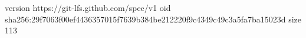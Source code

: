 version https://git-lfs.github.com/spec/v1
oid sha256:29f7063f00ef4436357015f7639b384be212220f9c4349c49c3a5fa7ba15023d
size 113
